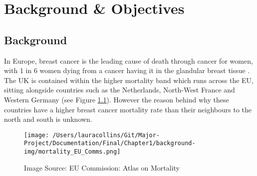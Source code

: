 \chapter{Background \& Objectives}

\section{Background}



In Europe, breast cancer is the leading cause of death through cancer for women, with 1 in 6 women dying from a cancer having it in the glandular breast tissue \cite{European_Commission_2009}. The UK is contained within the higher mortality band which runs across the EU, sitting alongside countries such as the Netherlands, North-West France and Western Germany (see Figure \ref{fig:mortality-band}). However the reason behind why these countries have a higher breast cancer mortality rate than their neighbours to the north and south is unknown.

\begin{figure}[!h]
  \center
  \texttt{[image: /Users/lauracollins/Git/Major-Project/Documentation/Final/Chapter1/background-img/mortality\_EU\_Comms.png]}
  \caption{Image Source: EU Commission: Atlas on Mortality \cite{European_Commission_2009}}
  \label{fig:mortality-band}
\end{figure}


